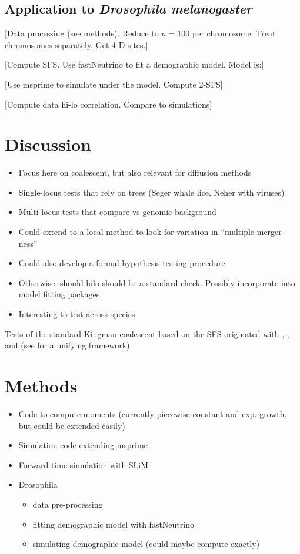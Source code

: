 \documentclass[11pt, letterpaper]{article}   	%
\begin{document}
\subsection*{Application to \textit{Drosophila melanogaster}}

[Data processing (see methods). Reduce to $n=100$ per chromosome. Treat chromosomes separately. Get 4-D sites.]

[Compute SFS. Use fastNeutrino to fit a demographic model. Model is:]

[Use msprime to simulate under the model. Compute 2-SFS]

[Compute data hi-lo correlation. Compare to simulations]

\section*{Discussion}
\begin{itemize}
    \item Focus here on coalescent, but also relevant for diffusion methods
    \item Single-locus tests that rely on trees (Seger whale lice, Neher with viruses)
    \item Multi-locus tests that compare vs genomic background
    \item Could extend to a local method to look for variation in ``multiple-merger-ness''
    \item Could also develop a formal hypothesis testing procedure.
    \item Otherwise, should hilo should be a standard check. Possibly incorporate into model fitting packages.
    \item Interesting to test across species.
\end{itemize}

Tests of the standard Kingman coalescent based on the SFS originated with \cite{Tajima1989}, \cite{FuLi1993}, and \cite{SimonsenEtAl1995} (see \cite{Achaz2009} for a unifying framework).

\section*{Methods}
\begin{itemize}
    \item Code to compute moments (currently piecewise-constant and exp. growth, but could be extended easily)
    \item Simulation code extending msprime
    \item Forward-time simulation with SLiM
    \item Drosophila
    \begin{itemize}
        \item data pre-processing
        \item fitting demographic model with fastNeutrino
        \item simulating demographic model (could maybe compute exactly)
    \end{itemize}
\end{itemize}

\printbibliography
\end{document}
